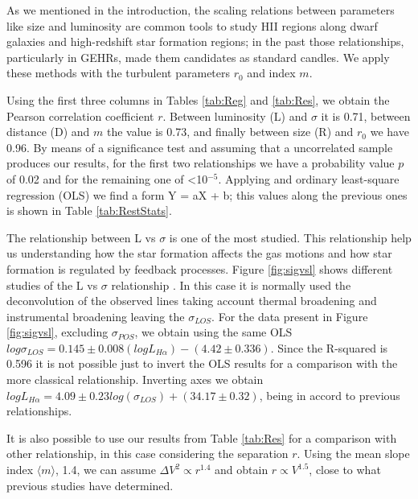 \documentclass[fleqn,usenatbib, useAMS, a4paper]{mnras}
\begin{document}
As we mentioned in the introduction, the scaling relations between parameters like size and luminosity are common tools to study HII regions along dwarf galaxies and high-redshift star formation regions; in the past those relationships, particularly in GEHRs, made them candidates as standard candles. 
We apply these methods with the turbulent parameters \(r_0\) and index \(m\).

Using the first three columns in Tables \ref{tab:Reg} and \ref{tab:Res}, we obtain the Pearson correlation coefficient $r$. Between luminosity (L) and \(\sigma\) it is 0.71, between distance (D) and \(m\) the value is 0.73, and finally between size (R) and \(r_0\) we have 0.96. 
By means of a significance test and assuming that a uncorrelated sample produces our results, for the first two relationships we have a probability value $p$ of 0.02 and for the remaining one of <10\(^{-5}\).
Applying and ordinary least-square regression (OLS) we find a form Y = aX + b; this values along the previous ones is shown in Table \ref{tab:RestStats}.

The relationship between L vs \(\sigma\) is one of the most studied. 
This relationship help us understanding how the star formation affects the gas motions and how star formation is regulated by feedback processes. 
Figure \ref{fig:sigvsl} shows different studies of the L vs \(\sigma\) relationship \citep{1988A&A...201..199A,Rozas:2006b,2015MNRAS.449.3568M}. 
In this case it is normally used the deconvolution of the observed lines taking account thermal broadening and instrumental broadening leaving the \(\sigma_{LOS}\). 
For the data present in Figure \ref{fig:sigvsl}, excluding \(\sigma_{POS}\), we obtain using the same OLS \(log \sigma_{LOS} = 0.145 \pm 0.008 (logL_{H\alpha}) - (4.42 \pm 0.336) \).
Since the R-squared is 0.596 it is not possible just to invert the OLS results for a comparison with the more classical relationship. Inverting axes we obtain \(log L_{H\alpha} = 4.09 \pm 0.23 log (\sigma_{LOS}) + (34.17 \pm 0.32) \), being in accord to previous relationships. 

It is also possible to use our results from Table \ref{tab:Res} for a comparison with other relationship, in this case considering the separation \(r\).
Using the mean slope index \(\langle m \rangle \), 1.4, we can assume \(\Delta V^{2} \propto r^{1.4} \) and obtain \(r \propto V^{1.5} \), close to what previous studies have determined. 
\end{document}
